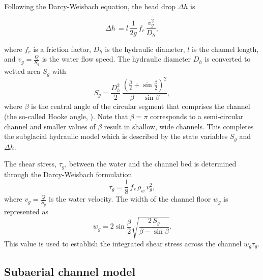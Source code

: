 \documentclass[draft]{agujournal2019}
\begin{document}
Following the Darcy-Weisbach equation, the head drop $\Delta h$ is
\begin{linenomath*}
  \begin{equation}
    \label{eq:dh}
    \Delta h \,  = l \,\frac{1}{2g} \,f_r\,\frac{v_g^2}{D_h},
  \end{equation}
\end{linenomath*}
\noindent where $f_r$ is a friction factor, $D_h$ is the hydraulic diameter, $l$ is the channel length, and $v_g=\frac{Q}{S_g}$ is the water flow speed.
%
The hydraulic diameter $D_h$ is converted to wetted area $S_g$ with
\begin{equation}
  \label{eq:Dh2S}
  S_g= \frac{D_h^2}{2}\,\frac{(\frac{\beta}{2}+\sin \frac{\beta}{2})^2}{\beta - \sin \beta},
\end{equation}
where $\beta$ is the central angle of the circular segment that comprises the channel (the so-called Hooke angle, ). Note that $\beta =\pi$ corresponds to a semi-circular channel and smaller values of $\beta$ result in shallow, wide channels.
This completes the subglacial hydraulic model which is described by the state variables $S_g$ and $\Delta h$.

The shear stress, $\tau_g$, between the water and the channel bed is determined through the Darcy-Weisbach formulation
\begin{equation}
  \label{eq:tau_g}
  \tau_g=\frac{1}{8}\,f_r\,\rho_w\,v_g^2,
\end{equation}
%
where $v_g = \frac{Q}{S_g}$ is the water velocity.
%
The width of the channel floor $w_g$ is represented as
\begin{equation}
  \label{eq:dh2wc}
  w_g = 2  \sin \frac{\beta}{2} \sqrt{\frac{2\, S_g}{\beta -\sin \beta}}.
\end{equation}
%
This value is used to establish the integrated shear stress across the channel $w_g\tau_g$.

\subsection{Subaerial channel  model}
\label{sect:fluv}
\end{document}
